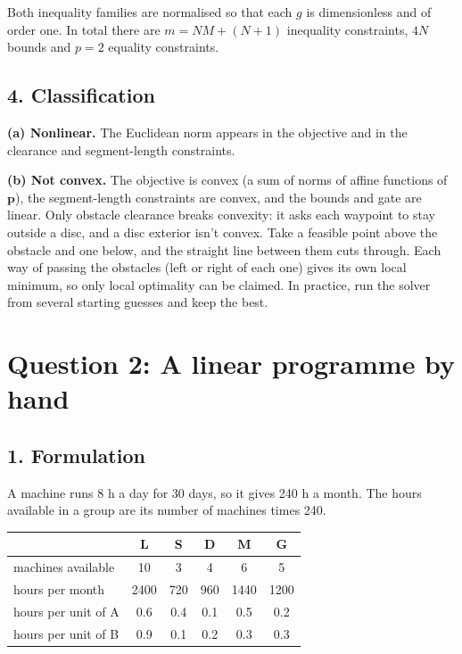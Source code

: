 \documentclass[11pt,a4paper]{article}
\begin{document}
Both inequality families are normalised so that each $g$ is dimensionless and
of order one. In total there are $m = NM + (N+1)$ inequality constraints, $4N$
bounds and $p = 2$ equality constraints.

\subsection*{4. Classification}

\textbf{(a) Nonlinear.} The Euclidean norm appears in the objective and in the
clearance and segment-length constraints.

\textbf{(b) Not convex.} The objective is convex (a sum of norms of affine
functions of $\bm{p}$), the segment-length constraints are convex, and the
bounds and gate are linear. Only obstacle clearance breaks convexity: it asks
each waypoint to stay outside a disc, and a disc exterior isn't convex. Take a
feasible point above the obstacle and one below, and the straight line between
them cuts through. Each way of passing the obstacles (left or right of each one)
gives its own local minimum, so only local optimality can be claimed. In
practice, run the solver from several starting guesses and keep the best.

\newpage
\section*{Question 2: A linear programme by hand}

\subsection*{1. Formulation}

A machine runs 8 h a day for 30 days, so it gives 240 h a month. The hours
available in a group are its number of machines times 240.

\begin{center}
\begin{tabular}{lccccc}
\toprule
 & L & S & D & M & G \\
\midrule
machines available  & 10   & 3   & 4   & 6    & 5    \\
hours per month     & 2400 & 720 & 960 & 1440 & 1200 \\
hours per unit of A & 0.6  & 0.4 & 0.1 & 0.5  & 0.2  \\
hours per unit of B & 0.9  & 0.1 & 0.2 & 0.3  & 0.3  \\
\bottomrule
\end{tabular}
\end{center}
\end{document}
